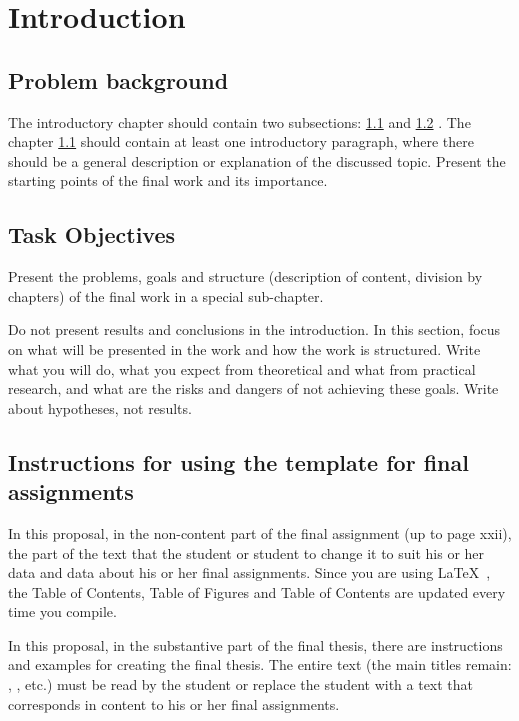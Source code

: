 \chapter{Introduction}\label{cha:introduction}

\section{Problem background}\label{sec:problem_background}
The introductory chapter should contain two subsections: \ref{sec:problem_background}  and \ref{sec:Task_Objectives} . The chapter \ref{sec:problem_background}  should contain at least one introductory paragraph, where there should be a general description or explanation of the discussed topic. Present the starting points of the final work and its importance.


\section{Task Objectives}\label{sec:Task_Objectives}
Present the problems, goals and structure (description of content, division by chapters) of the final work in a special sub-chapter.

Do not present results and conclusions in the introduction. In this section, focus on what will be presented in the work and how the work is structured. Write what you will do, what you expect from theoretical and what from practical research, and what are the risks and dangers of not achieving these goals. Write about hypotheses, not results.

\section{Instructions for using the template for final assignments}\label{sec:using_the_template}
In this proposal, in the non-content part of the final assignment (up to page xxii), the part of the text that the student or student to change it to suit his or her data and data about his or her final assignments. Since you are using \LaTeX~, the Table of Contents, Table of Figures and Table of Contents are updated every time you compile.

In this proposal, in the substantive part of the final thesis, there are instructions and examples for creating the final thesis. The entire text (the main titles remain: , , etc.) must be read by the student or replace the student with a text that corresponds in content to his or her final assignments.

